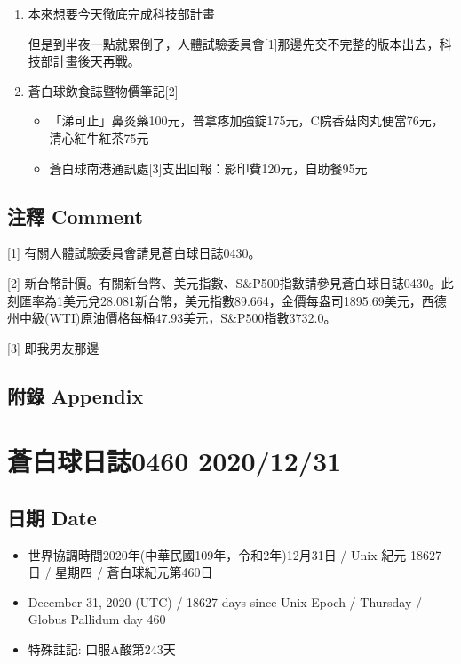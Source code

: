 \documentclass[a5paper, 10pt
]{book}
\providecommand{\tightlist}{%
  \setlength{\itemsep}{0pt}\setlength{\parskip}{0pt}}
\begin{document}
\begin{enumerate}
\def\labelenumi{\arabic{enumi}.}
\item
  本來想要今天徹底完成科技部計畫

  但是到半夜一點就累倒了，人體試驗委員會{[}1{]}那邊先交不完整的版本出去，科技部計畫後天再戰。
\item
  蒼白球飲食誌暨物價筆記{[}2{]}

  \begin{itemize}
  \tightlist
  \item
    「涕可止」鼻炎藥100元，普拿疼加強錠175元，C院香菇肉丸便當76元，清心紅牛紅茶75元
  \item
    蒼白球南港通訊處{[}3{]}支出回報：影印費120元，自助餐95元
  \end{itemize}
\end{enumerate}

\hypertarget{ux6ce8ux91cb-comment-29}{%
\subsection{注釋 Comment}\label{ux6ce8ux91cb-comment-29}}

{[}1{]} 有關人體試驗委員會請見蒼白球日誌0430。

{[}2{]}
新台幣計價。有關新台幣、美元指數、S\&P500指數請參見蒼白球日誌0430。此刻匯率為1美元兌28.081新台幣，美元指數89.664，金價每盎司1895.69美元，西德州中級(WTI)原油價格每桶47.93美元，S\&P500指數3732.0。

{[}3{]} 即我男友那邊

\hypertarget{ux9644ux9304-appendix-29}{%
\subsection{附錄 Appendix}\label{ux9644ux9304-appendix-29}}

\hypertarget{ux84bcux767dux7403ux65e5ux8a8c0460-20201231}{%
\section{蒼白球日誌0460
2020/12/31}\label{ux84bcux767dux7403ux65e5ux8a8c0460-20201231}}

\hypertarget{ux65e5ux671f-date-30}{%
\subsection{日期 Date}\label{ux65e5ux671f-date-30}}

\begin{itemize}
\tightlist
\item
  世界協調時間2020年(中華民國109年，令和2年)12月31日 / Unix 紀元 18627
  日 / 星期四 / 蒼白球紀元第460日
\item
  December 31, 2020 (UTC) / 18627 days since Unix Epoch / Thursday /
  Globus Pallidum day 460
\item
  特殊註記: 口服A酸第243天
\end{itemize}
\end{document}
